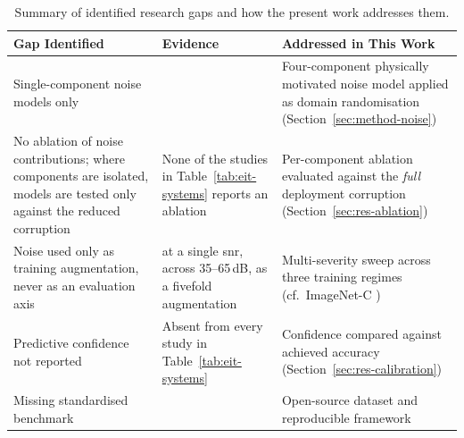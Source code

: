 \begin{table}
\centering
\caption[Research gaps and how the present work addresses them]{Summary of identified research gaps and how the present work addresses them.}
\label{tab:gaps-summary}
\small
{}
\setlength{\tabcolsep}{8pt}
\renewcommand{\arraystretch}{1.15}
\begin{tabularx}{\textheight}{@{}%
  >{\raggedright\arraybackslash\hsize=1.05\hsize}X
  >{\raggedright\arraybackslash\hsize=0.80\hsize}X
  >{\raggedright\arraybackslash\hsize=1.15\hsize}X@{}}
\toprule
\textbf{Gap Identified} & \textbf{Evidence} & \textbf{Addressed in This Work} \\
\midrule
Single-component noise models only & \textcite{chen2023, park2022skin} & Four-component physically motivated noise model applied as domain randomisation (Section~\ref{sec:method-noise}) \\
\addlinespace
No ablation of noise contributions; where components are isolated, models are tested only against the reduced corruption & None of the studies in Table~\ref{tab:eit-systems} reports an ablation & Per-component ablation evaluated against the \emph{full} deployment corruption (Section~\ref{sec:res-ablation}) \\
\addlinespace
Noise used only as training augmentation, never as an evaluation axis & \textcite{chen2023} at a single \gls{snr}, \textcite{dong2025lattice} across 35--65\,dB, \textcite{park2022skin} as a fivefold augmentation & Multi-severity sweep across three training regimes (cf.\ ImageNet-C \parencite{hendrycks2019}) \\
\addlinespace
Predictive confidence not reported & Absent from every study in Table~\ref{tab:eit-systems} & Confidence compared against achieved accuracy (Section~\ref{sec:res-calibration}) \\
\addlinespace
Missing standardised benchmark & \textcite{koo2024} & Open-source dataset and reproducible framework \\
\bottomrule
\end{tabularx}
\end{table}
